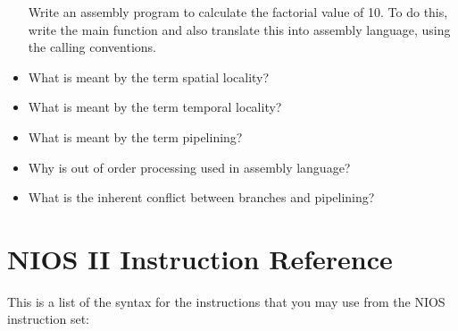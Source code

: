 \documentclass[10pt]{article}
\begin{document}
\begin{itemize}
Write an assembly program to calculate the factorial value of 10.  To do this, write the main function and also translate this into assembly language, using the calling conventions.  
    \vspace{3in}

\newpage


\item What is meant by the term spatial locality?

\item What is meant by the term temporal locality?

\item What is meant by the term pipelining?

\item Why is out of order processing used in assembly language?

\item What is the inherent conflict between branches and pipelining?

\end{itemize}

\newpage

\section*{NIOS II Instruction Reference}

This is a list of the syntax for the instructions that you may use
from the NIOS instruction set:\\
\end{document}

